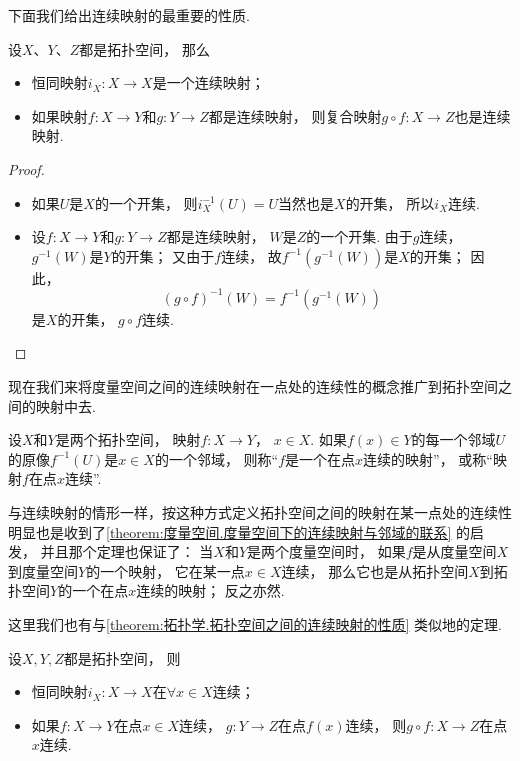 下面我们给出连续映射的最重要的性质.

\begin{theorem}\label{theorem:拓扑学.拓扑空间之间的连续映射的性质}
设\(X\)、\(Y\)、\(Z\)都是拓扑空间，
那么\begin{itemize}
	\item 恒同映射\(i_X\colon X \to X\)是一个连续映射；
	\item 如果映射\(f\colon X \to Y\)和\(g\colon Y \to Z\)都是连续映射，
	则复合映射\(g \circ f\colon X \to Z\)也是连续映射.
\end{itemize}
\begin{proof}
\begin{itemize}
	\item 如果\(U\)是\(X\)的一个开集，
	则\(i_X^{-1}(U) = U\)当然也是\(X\)的开集，
	所以\(i_X\)连续.

	\item 设\(f\colon X \to Y\)和\(g\colon Y \to Z\)都是连续映射，
	\(W\)是\(Z\)的一个开集.
	由于\(g\)连续，
	\(g^{-1}(W)\)是\(Y\)的开集；
	又由于\(f\)连续，
	故\(f^{-1}(g^{-1}(W))\)是\(X\)的开集；
	因此，\begin{equation*}
		(g \circ f)^{-1}(W) = f^{-1}(g^{-1}(W))
	\end{equation*}是\(X\)的开集，
	\(g \circ f\)连续.
	\qedhere
\end{itemize}
\end{proof}
\end{theorem}

现在我们来将度量空间之间的连续映射在一点处的连续性的概念推广到拓扑空间之间的映射中去.

\begin{definition}
设\(X\)和\(Y\)是两个拓扑空间，
映射\(f\colon X \to Y\)，
\(x \in X\).
如果\(f(x) \in Y\)的每一个邻域\(U\)的原像\(f^{-1}(U)\)是\(x \in X\)的一个邻域，
则称“\(f\)是一个在点\(x\)连续的映射”，
或称“映射\(f\)在点\(x\)连续”.
\end{definition}
与连续映射的情形一样，按这种方式定义拓扑空间之间的映射在某一点处的连续性
明显也是收到了\cref{theorem:度量空间.度量空间下的连续映射与邻域的联系} 的启发，
并且那个定理也保证了：
当\(X\)和\(Y\)是两个度量空间时，
如果\(f\)是从度量空间\(X\)到度量空间\(Y\)的一个映射，
它在某一点\(x \in X\)连续，
那么它也是从拓扑空间\(X\)到拓扑空间\(Y\)的一个在点\(x\)连续的映射；
反之亦然.

这里我们也有与\cref{theorem:拓扑学.拓扑空间之间的连续映射的性质} 类似地的定理.
\begin{theorem}
设\(X,Y,Z\)都是拓扑空间，
则\begin{itemize}
	\item 恒同映射\(i_X\colon X \to X\)在\(\forall x \in X\)连续；
	\item 如果\(f\colon X \to Y\)在点\(x \in X\)连续，
	\(g\colon Y \to Z\)在点\(f(x)\)连续，
	则\(g \circ f\colon X \to Z\)在点\(x\)连续.
\end{itemize}
\end{theorem}

